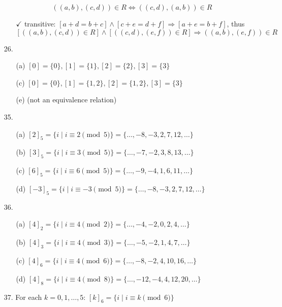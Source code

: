 \documentclass{article}
\begin{document}
\begin{enumerate}
\begin{itemize}
            \[
            ((a,b), (c,d)) \in R \Leftrightarrow ((c,d),(a,b)) \in R
            \]
            \item[$\checkmark$] transitive: $[a+d = b+c] \land [c+e = d+f] \Rightarrow [a+e = b+f]$, thus
            \[
            [((a,b),(c,d)) \in R] \land [((c,d),(e,f)) \in R] \Rightarrow ((a,b),(e,f)) \in R
            \]
        \end{itemize}
    \item[26.]
        \begin{itemize}
            \item[(a)] $[0] = \{ 0 \}, [1] = \{ 1 \}, [2] = \{ 2 \}, [3] = \{ 3 \}$
            \item[(c)] $[0] = \{ 0 \}, [1] = \{ 1, 2 \}, [2] = \{ 1, 2 \}, [3] = \{ 3 \}$
            \item[(e)] (not an equivalence relation)
        \end{itemize}
    \item[35.]
        \begin{itemize}
            \item[(a)] $[2]_{5} = \{ i \mid i \equiv 2 \pmod 5 \} = \{ \ldots, -8, -3, 2, 7, 12, \ldots \}$
            \item[(b)] $[3]_{5} = \{ i \mid i \equiv 3 \pmod 5 \} = \{ \ldots, -7, -2, 3, 8, 13, \ldots \}$
            \item[(c)] $[6]_{5} = \{ i \mid i \equiv 6 \pmod 5 \} = \{ \ldots, -9, -4, 1, 6, 11, \ldots \}$
            \item[(d)] $[-3]_{5} = \{ i \mid i \equiv -3 \pmod 5 \} = \{ \ldots, -8, -3, 2, 7, 12, \ldots \}$
        \end{itemize}
    \item[36.]
        \begin{itemize}
            \item[(a)] $[4]_{2} = \{ i \mid i \equiv 4 \pmod 2 \} = \{ \ldots, -4, -2, 0, 2, 4, \ldots \}$
            \item[(b)] $[4]_{3} = \{ i \mid i \equiv 4 \pmod 3 \} = \{ \ldots, -5, -2, 1, 4, 7, \ldots \}$
            \item[(c)] $[4]_{6} = \{ i \mid i \equiv 4 \pmod 6 \} = \{ \ldots, -8, -2, 4, 10, 16, \ldots \}$
            \item[(d)] $[4]_{8} = \{ i \mid i \equiv 4 \pmod 8 \} = \{ \ldots, -12, -4, 4, 12, 20, \ldots \}$
        \end{itemize}
    \item[37.] For each $k = 0, 1, \ldots, 5$: $[k]_{6} = \{ i \mid i \equiv k \pmod 6 \}$

\end{enumerate}
\end{document}
